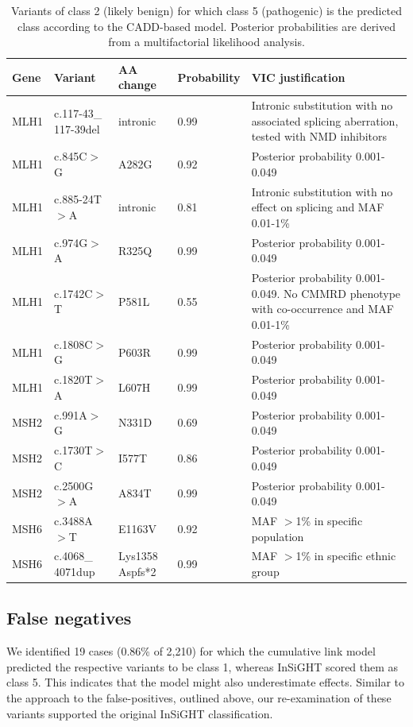 \begin{table}
\small
\begin{tabulary}{\linewidth}{LLLLL}
  Gene & Variant & AA change & Probability & VIC justification \\
  \hline
  \rule{0pt}{2.5ex}MLH1 & c.117-43\_ 117-39del & intronic & 0.99 & Intronic substitution with no associated splicing aberration, tested with NMD inhibitors \\
  \rule{0pt}{2.5ex}MLH1 & c.845C$>$G & A282G & 0.92 &  Posterior probability 0.001-0.049 \\
  \rule{0pt}{2.5ex}MLH1 & c.885-24T$>$A & intronic & 0.81 & Intronic substitution with no effect on splicing and MAF 0.01-1\% \\
  \rule{0pt}{2.5ex}MLH1 & c.974G$>$A & R325Q & 0.99 &  Posterior probability 0.001-0.049 \\
  \rule{0pt}{2.5ex}MLH1 & c.1742C$>$T & P581L & 0.55 & Posterior probability 0.001-0.049. No CMMRD phenotype with co-occurrence and MAF 0.01-1\% \\
  \rule{0pt}{2.5ex}MLH1 & c.1808C$>$G & P603R & 0.99 & Posterior probability 0.001-0.049 \\
  \rule{0pt}{2.5ex}MLH1 & c.1820T$>$A & L607H & 0.99 &  Posterior probability 0.001-0.049 \\
  \rule{0pt}{2.5ex}MSH2 & c.991A$>$G & N331D & 0.69 & Posterior probability 0.001-0.049 \\
  \rule{0pt}{2.5ex}MSH2 & c.1730T$>$C & I577T & 0.86 & Posterior probability 0.001-0.049 \\
  \rule{0pt}{2.5ex}MSH2 & c.2500G$>$A & A834T & 0.99 &  Posterior probability 0.001-0.049 \\
  \rule{0pt}{2.5ex}MSH6 & c.3488A$>$T & E1163V & 0.92 & MAF $>$1\% in specific population \\
  \rule{0pt}{2.5ex}MSH6 & c.4068\_ 4071dup & Lys1358 Aspfs*2 & 0.99 & MAF $>$1\% in specific ethnic group \\
  \hline
\end{tabulary}
\caption[Variants of class 2 for which class 5 is the predicted]{\label{table:caddmmr_vic2to5} Variants of class 2 (likely benign) for which class 5 (pathogenic) is the predicted class according to the CADD-based model. Posterior probabilities are derived from a multifactorial likelihood analysis.}
\end{table}

\subsection{False negatives}
We identified 19 cases (0.86\% of 2,210) for which the cumulative link model predicted the respective variants to be class 1, whereas InSiGHT scored them as class 5.
This indicates that the model might also underestimate effects.
Similar to the approach to the false-positives, outlined above, our re-examination of these variants supported the original InSiGHT classification.

